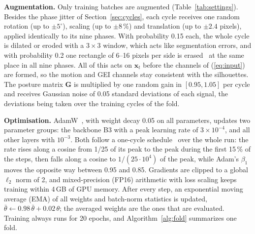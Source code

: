 \documentclass[conference]{IEEEtran}
\begin{document}
\textbf{Augmentation.} Only training batches are augmented (Table~\ref{tab:settings}). Besides the phase jitter of Section~\ref{sec:cycles}, each cycle receives one random rotation (up to $\pm5^\circ$), scaling (up to $\pm8$\,\%) and translation (up to $\pm2.4$ pixels), applied identically to its nine phases. With probability 0.15 each, the whole cycle is dilated or eroded with a $3\times3$ window, which acts like segmentation errors, and with probability 0.2 one rectangle of 6--16 pixels per side is erased~\cite{erasing} at the same place in all nine phases. All of this acts on $\mathbf{x}_t$ before the channels of (\ref{eq:input}) are formed, so the motion and GEI channels stay consistent with the silhouettes. The posture matrix $\mathbf{G}$ is multiplied by one random gain in $[0.95,1.05]$ per cycle and receives Gaussian noise of 0.05 standard deviations of each signal, the deviations being taken over the training cycles of the fold.

\textbf{Optimisation.} AdamW~\cite{adamw}, with weight decay 0.05 on all parameters, updates two parameter groups: the backbone B3 with a peak learning rate of $3\times10^{-4}$, and all other layers with $10^{-3}$. Both follow a one-cycle schedule~\cite{onecycle} over the whole run: the rate rises along a cosine from 1/25 of its peak to the peak during the first 15\,\% of the steps, then falls along a cosine to $1/(25\cdot10^4)$ of the peak, while Adam's $\beta_1$ moves the opposite way between 0.95 and 0.85. Gradients are clipped to a global $\ell_2$ norm of 2, and mixed-precision (FP16) arithmetic with loss scaling keeps training within 4\,GB of GPU memory. After every step, an exponential moving average (EMA) of all weights and batch-norm statistics is updated, $\bar{\theta}\leftarrow0.98\,\bar{\theta}+0.02\,\theta$; the averaged weights are the ones that are evaluated. Training always runs for 20 epochs, and Algorithm~\ref{alg:fold} summarizes one fold.
\end{document}
